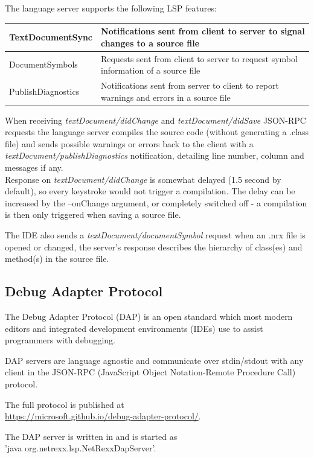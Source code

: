 The \nr{} language server supports the following LSP features: 

\begin{tabular} { |p{4.5cm}|p{8cm}|  }
\hline
TextDocumentSync & Notifications sent from client to server to signal changes to a source file \\
\hline
DocumentSymbols & Requests sent from client to server to request symbol information of a source file \\
\hline
PublishDiagnostics & Notifications sent from server to client to report warnings and errors in a source file \\
\hline
\end{tabular}

When receiving \emph{textDocument/didChange} and \emph{textDocument/didSave} JSON-RPC requests the \nr{} language server 
compiles the source code (without generating a .class file) and sends possible warnings or errors back 
to the client with a \\ 
\emph{textDocument/publishDiagnostics} notification, detailing line number, column and messages if any.\\
Response on \emph{textDocument/didChange} is somewhat delayed (1.5 second by default), so every keystroke would
not trigger a compilation. The delay can be increased by the --onChange argument, or completely switched off 
- a compilation is then only triggered when saving a source file. 

The IDE also sends a \emph{textDocument/documentSymbol} request when an .nrx file is opened or changed,
 the server's response describes the hierarchy of class(es) and method(s) in the 
source file.

\subsection{Debug Adapter Protocol}

The Debug Adapter Protocol (DAP) is an open standard which most modern editors and
integrated development environments (IDEs) use to assist programmers with debugging.

DAP servers are language agnostic and communicate over stdin/stdout with any client
in the JSON-RPC (JavaScript Object Notation-Remote Procedure Call) protocol.

The full protocol is published at \\ \url{https://microsoft.github.io/debug-adapter-protocol/}.

The \nr{} DAP server is written in \nr{} and is started as \\ 'java org.netrexx.lsp.NetRexxDapServer'.

